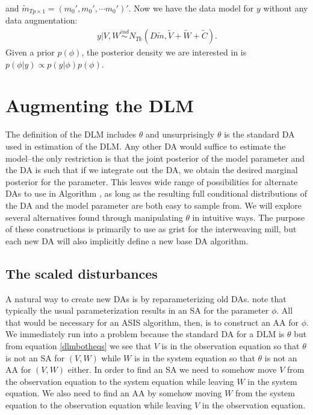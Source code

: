 \documentclass[12pt]{article}
\begin{document}
and $\tilde{m}_{Tp\times 1} = (m_0', m_0', \cdots m_0')'$. Now we have the data model for $y$ without any data augmentation:
\begin{align}
  y|V,W \stackrel{ind}{\sim} N_{Tk}(D\tilde{m}, \tilde{V} + \tilde{W} + \tilde{C}). \label{margmodel}
\end{align}
Given a prior $p(\phi)$, the posterior density we are interested in is $p(\phi|y)\propto p(y|\phi)p(\phi)$.

\section{Augmenting the DLM}\label{sec:DAs}
The definition of the DLM includes $\theta$ and unsurprisingly $\theta$ is the standard DA used in estimation of the DLM. Any other DA would suffice to estimate the model--the only restriction is that the joint posterior of the model parameter and the DA is such that if we integrate out the DA, we obtain the desired marginal posterior for the parameter. This leaves wide range of possibilities for alternate DAs to use in Algorithm , as long as the resulting full conditional distributions of the DA and the model parameter are both easy to sample from. We will explore several alternatives found through manipulating $\theta$ in intuitive ways. The purpose of these constructions is primarily to use as grist for the interweaving mill, but each new DA will also implicitly define a new base DA algorithm.

\subsection{The scaled disturbances}\label{sec:DAs:dist}

A natural way to create new DAs is by reparameterizing old DAs. \citet{papaspiliopoulos2007general} note that typically the usual parameterization results in an SA for the parameter $\phi$. All that would be necessary for an ASIS algorithm, then, is to construct an AA for $\phi$. We immediately run into a problem because the standard DA for a DLM is $\theta$ but from equation \eqref{dlmbotheqs} we see that $V$ is in the observation equation so that $\theta$ is not an SA for $(V,W)$ while $W$ is in the system equation so that $\theta$ is not an AA for $(V,W)$ either. In order to find an SA we need to somehow move $V$ from the observation equation to the system equation while leaving $W$ in the system equation. We also need to find an AA by somehow moving $W$ from the system equation to the observation equation while leaving $V$ in the observation equation.
\end{document}
